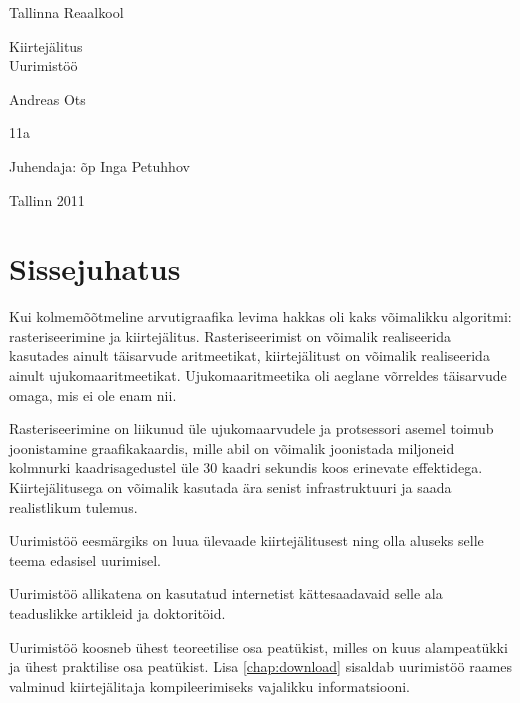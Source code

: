 \documentclass[a4paper,12pt]{report}
\begin{document}
\thispagestyle{empty}
\begin{center}
Tallinna Reaalkool

\vfill

Kiirtejälitus\\
Uurimistöö

\vfill

\end{center}

\begin{raggedleft}

Andreas Ots

11a

Juhendaja: õp Inga Petuhhov

\end{raggedleft}

\vfill

\begin{center}

Tallinn 2011

\end{center}
\clearpage

\tableofcontents
\listoffigures

\chapter*{Sissejuhatus}
\thispagestyle{empty}
Kui kolmemõõtmeline arvutigraafika levima hakkas oli kaks võimalikku
algoritmi: rasteriseerimine ja kiirtejälitus. Rasteriseerimist on võimalik
realiseerida kasutades ainult täisarvude aritmeetikat, kiirtejälitust on
võimalik realiseerida ainult ujukomaaritmeetikat. Ujukomaaritmeetika oli
aeglane võrreldes täisarvude omaga, mis ei ole enam nii. 

Rasteriseerimine on liikunud üle ujukomaarvudele ja protsessori asemel
toimub joonis\-tamine graafikakaardis, mille abil on võimalik joonistada
miljoneid kolmnurki kaadri\-sagedustel üle 30 kaadri sekundis koos erinevate
effektidega. Kiirtejälitusega on võimalik kasutada ära senist infrastruktuuri
ja saada realistlikum tulemus.

Uurimistöö eesmärgiks on luua ülevaade kiirtejälitusest ning olla aluseks
selle teema edasisel uurimisel.

Uurimistöö allikatena on kasutatud internetist kättesaadavaid selle ala
teaduslikke artikleid ja doktoritöid.

Uurimistöö koosneb ühest teoreetilise osa peatükist, milles on kuus
alampeatükki ja ühest praktilise osa peatükist. Lisa \ref{chap:download} sisaldab
uurimistöö raames valminud kiirtejälitaja kompileerimiseks vajalikku
informatsiooni.
\end{document}
